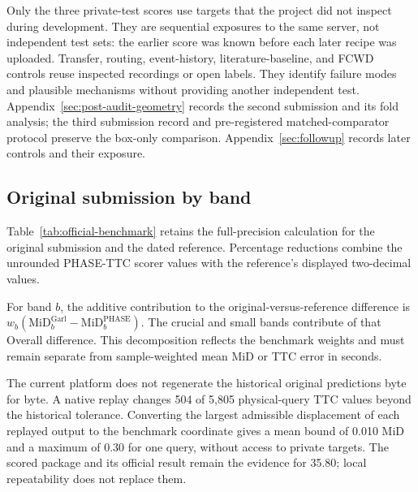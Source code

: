 Only the three private-test scores use targets that the project did not inspect during development. They are sequential exposures to the same server, not independent test sets: the earlier score was known before each later recipe was uploaded. Transfer, routing, event-history, literature-baseline, and FCWD controls reuse inspected recordings or open labels. They identify failure modes and plausible mechanisms without providing another independent test. Appendix~\ref{sec:post-audit-geometry} records the second submission and its fold analysis; the third submission record and pre-registered matched-comparator protocol preserve the box-only comparison. Appendix~\ref{sec:followup} records later controls and their exposure.

\subsection{Original submission by band}

Table~\ref{tab:official-benchmark} retains the full-precision calculation for the original submission and the dated reference. Percentage reductions combine the unrounded PHASE-TTC scorer values with the reference's displayed two-decimal values.



For band $b$, the additive contribution to the original-versus-reference difference is $w_b(\mathrm{MiD}^{\mathrm{Garl}}_b-\mathrm{MiD}^{\mathrm{PHASE}}_b)$. The crucial and small bands contribute \OfficialCrucialSmallContributionShare{} of that Overall difference. This decomposition reflects the benchmark weights and must remain separate from sample-weighted mean MiD or TTC error in seconds.

The current platform does not regenerate the historical original predictions byte for byte. A native replay changes 504 of 5,805 physical-query TTC values beyond the historical tolerance. Converting the largest admissible displacement of each replayed output to the benchmark coordinate gives a mean bound of 0.010 MiD and a maximum of 0.30 for one query, without access to private targets. The scored package and its official result remain the evidence for 35.80; local repeatability does not replace them.
\FloatBarrier
